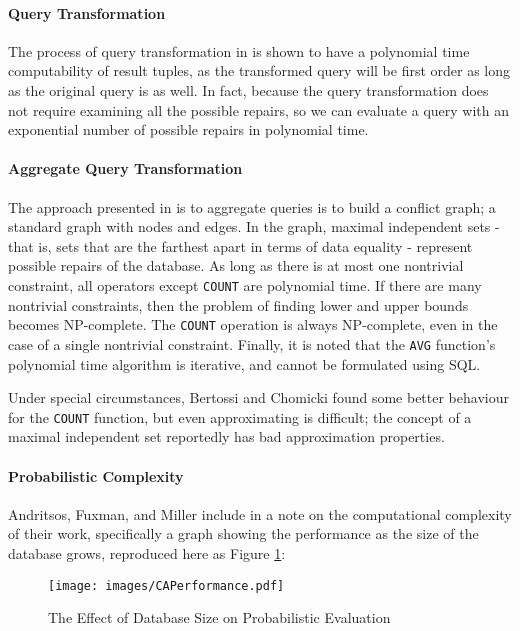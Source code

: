 \documentclass[a4paper]{report}
\begin{document}
\paragraph{Query Transformation} 
The process of query transformation in \cite{CQ} is shown to have a polynomial time computability of result tuples, as the transformed query will be first order as long as the original query is as well. In fact, because the query transformation does not require examining all the possible repairs, so we can evaluate a query with an exponential number of possible repairs in polynomial time.

\paragraph{Aggregate Query Transformation}
The approach presented in \cite{CQ} is to aggregate queries is to build a conflict graph; a standard graph with nodes and edges. In the graph, maximal independent sets - that is, sets that are the farthest apart in terms of data equality - represent possible repairs of the database. As long as there is at most one nontrivial constraint, all operators except \texttt{COUNT} are polynomial time. If there are many nontrivial constraints, then the problem of finding lower and upper bounds becomes NP-complete. The \texttt{COUNT} operation is always NP-complete, even in the case of a single nontrivial constraint. Finally, it is noted that the \texttt{AVG} function's polynomial time algorithm is iterative, and cannot be formulated using SQL. 

Under special circumstances, Bertossi and Chomicki found some better behaviour for the \texttt{COUNT} function, but even approximating is difficult; the concept of a maximal independent set reportedly has bad approximation properties.

\paragraph{Probabilistic Complexity}
Andritsos, Fuxman, and Miller include in \cite{CA} a note on the computational complexity of their work, specifically a graph showing the performance as the size of the database grows, reproduced here as Figure \ref{CAPerformance}:

\begin{figure}[!h]
  \centering \texttt{[image: images/CAPerformance.pdf]}
  \caption[The Effect of Database Size on Probabilistic Evaluation]{The Effect of Database Size on Probabilistic Evaluation \cite{CA}}
  \label{CAPerformance}
\end{figure}
\end{document}
